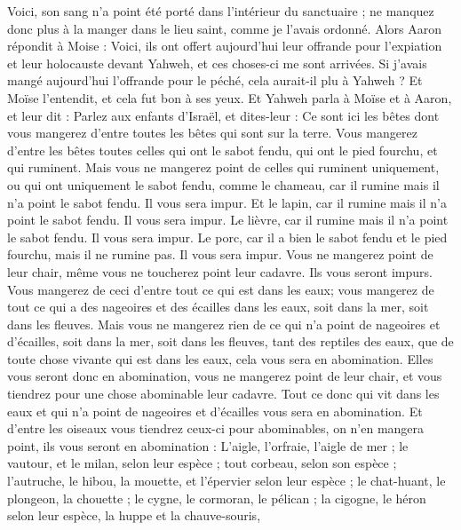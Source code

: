 \begin{multicols}{2}
Voici, son sang n'a point été porté dans l'intérieur du sanctuaire ; ne manquez donc plus à la manger dans le lieu saint, comme je l'avais ordonné.
Alors Aaron répondit à Moise : Voici, ils ont offert aujourd'hui leur offrande pour l'expiation et leur holocauste devant Yahweh, et ces choses-ci me sont arrivées. Si j'avais mangé aujourd'hui l'offrande pour le péché, cela aurait-il plu à Yahweh ?
Et Moïse l'entendit, et cela fut bon à ses yeux.
\VerseOne{}Et Yahweh parla à Moïse et à Aaron, et leur dit :
Parlez aux enfants d'Israël, et dites-leur : Ce sont ici les bêtes dont vous mangerez d'entre toutes les bêtes qui sont sur la terre.
Vous mangerez d'entre les bêtes toutes celles qui ont le sabot fendu, qui ont le pied fourchu, et qui ruminent.
Mais vous ne mangerez point de celles qui ruminent uniquement, ou qui ont uniquement le sabot fendu, comme le chameau, car il rumine mais il n'a point le sabot fendu. Il vous sera impur.
Et le lapin, car il rumine mais il n'a point le sabot fendu. Il vous sera impur.
Le lièvre, car il rumine mais il n'a point le sabot fendu. Il vous sera impur.
Le porc, car il a bien le sabot fendu et le pied fourchu, mais il ne rumine pas. Il vous sera impur.
Vous ne mangerez point de leur chair, même vous ne toucherez point leur cadavre. Ils vous seront impurs.
Vous mangerez de ceci d'entre tout ce qui est dans les eaux; vous mangerez de tout ce qui a des nageoires et des écailles dans les eaux, soit dans la mer, soit dans les fleuves.
Mais vous ne mangerez rien de ce qui n'a point de nageoires et d'écailles, soit dans la mer, soit dans les fleuves, tant des reptiles des eaux, que de toute chose vivante qui est dans les eaux, cela vous sera en abomination.
Elles vous seront donc en abomination, vous ne mangerez point de leur chair, et vous tiendrez pour une chose abominable leur cadavre.
Tout ce donc qui vit dans les eaux et qui n'a point de nageoires et d'écailles vous sera en abomination.
Et d'entre les oiseaux vous tiendrez ceux-ci pour abominables, on n'en mangera point, ils vous seront en abomination : L'aigle, l'orfraie, l'aigle de mer ;
le vautour, et le milan, selon leur espèce ;
tout corbeau, selon son espèce ;
l'autruche, le hibou, la mouette, et l'épervier selon leur espèce ;
le chat-huant, le plongeon, la chouette ;
le cygne, le cormoran, le pélican ;
la cigogne, le héron selon leur espèce, la huppe et la chauve-souris,

\end{multicols}
